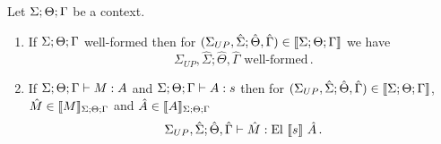 \documentclass[]{StandardTemplate}
\begin{document}
\begin{thm}[]
Let $ {\Sigma;\Theta;\Gamma} $ be a context.  \begin{enumerate}
\item If $ {\Sigma;\Theta;\Gamma}  $ well-formed then for $ (\Sigma_{UP}, \hat{\Sigma};\hat{\Theta}, \hat{\Gamma}) \in \llbracket {\Sigma;\Theta;\Gamma} \rrbracket $ we have \[
\Sigma_{UP}, \hat{\Sigma};\hat{\Theta}, \hat{\Gamma} \text{ well-formed}
\,.\]
\item If $ {\Sigma;\Theta;\Gamma} \vdash M : A $ and $ {\Sigma;\Theta;\Gamma} \vdash A : s $ then for $ (\Sigma_{UP}, \hat{\Sigma};\hat{\Theta}, \hat{\Gamma}) \in \llbracket {\Sigma;\Theta;\Gamma} \rrbracket $, $ \hat{M} \in \llbracket M \rrbracket_{\Sigma;\Theta;\Gamma} $ and $ \hat{A} \in \llbracket A \rrbracket_{\Sigma;\Theta;\Gamma} $ \[
\Sigma_{UP}, \hat{\Sigma}; \hat{\Theta}, \hat{\Gamma} \vdash \hat{M} : \text{El}~\llbracket s \rrbracket~\hat{A}
\,.\]
\end{enumerate} 
\end{thm}
\end{document}
